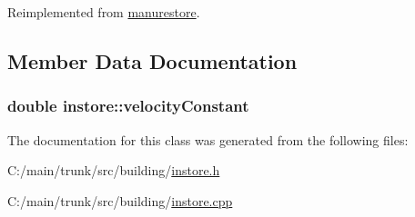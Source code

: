 Reimplemented from \hyperlink{classmanurestore_a8ac9597914271cef193878847c073724}{manurestore}.

\subsection{Member Data Documentation}
\hypertarget{classinstore_a0eebbd632b677efe27261ea75208dca3}{
\subsubsection[{velocityConstant}]{\setlength{\rightskip}{0pt plus 5cm}double {\bf instore::velocityConstant}}}
\label{classinstore_a0eebbd632b677efe27261ea75208dca3}


The documentation for this class was generated from the following files:\begin{DoxyCompactItemize}
\item 
C:/main/trunk/src/building/\hyperlink{instore_8h}{instore.h}\item 
C:/main/trunk/src/building/\hyperlink{instore_8cpp}{instore.cpp}\end{DoxyCompactItemize}
